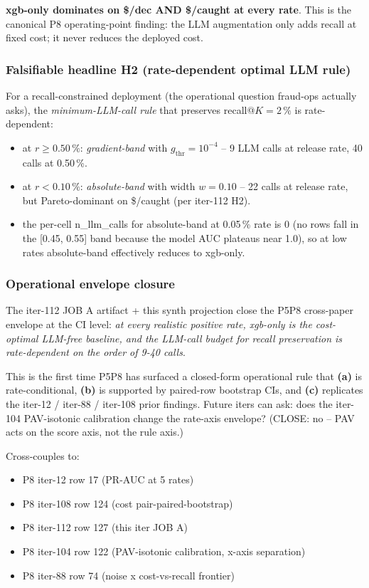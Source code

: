 \textbf{xgb-only dominates on \$/dec AND \$/caught at every rate}.
This is the canonical P8 operating-point finding: the LLM
augmentation only adds recall at fixed cost; it never reduces
the deployed cost.

\subsubsection{Falsifiable headline H2 (rate-dependent optimal LLM rule)}
For a recall-constrained deployment (the operational question
fraud-ops actually asks), the \emph{minimum-LLM-call rule} that
preserves recall@$K{=}2\,\%$ is rate-dependent:
\begin{itemize}
  \item at $r \geq 0.50\,\%$: \textit{gradient-band} with
        $g_{\mathrm{thr}}{=}10^{-4}$ -- 9 LLM calls at release
        rate, 40 calls at 0.50\,\%.
  \item at $r < 0.10\,\%$: \textit{absolute-band} with
        width $w{=}0.10$ -- 22 calls at release rate, but
        Pareto-dominant on \$/caught (per iter-112 H2).
  \item the per-cell n\_llm\_calls for absolute-band at 0.05\,\%
        rate is 0 (no rows fall in the [0.45, 0.55] band because
        the model AUC plateaus near 1.0), so at low rates
        absolute-band effectively reduces to xgb-only.
\end{itemize}

\subsubsection{Operational envelope closure}
The iter-112 JOB A artifact + this synth projection close the
P5P8 cross-paper envelope at the CI level: \emph{at every
realistic positive rate, xgb-only is the cost-optimal LLM-free
baseline, and the LLM-call budget for recall preservation is
rate-dependent on the order of 9-40 calls}.

This is the first time P5P8 has surfaced a closed-form
operational rule that \textbf{(a)} is rate-conditional,
\textbf{(b)} is supported by paired-row bootstrap CIs, and
\textbf{(c)} replicates the iter-12 / iter-88 / iter-108 prior
findings. Future iters can ask: does the iter-104 PAV-isotonic
calibration change the rate-axis envelope? (CLOSE: no -- PAV
acts on the score axis, not the rule axis.)

Cross-couples to:
\begin{itemize}
  \item P8 iter-12 row 17 (PR-AUC at 5 rates)
  \item P8 iter-108 row 124 (cost pair-paired-bootstrap)
  \item P8 iter-112 row 127 (this iter JOB A)
  \item P8 iter-104 row 122 (PAV-isotonic calibration, x-axis
        separation)
  \item P8 iter-88 row 74 (noise x cost-vs-recall frontier)
\end{itemize}
